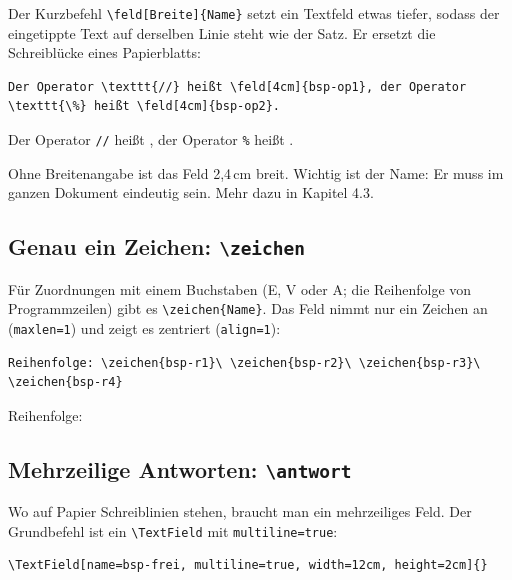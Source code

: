 \begin{Form}
Der Kurzbefehl \verb|\feld[Breite]{Name}| setzt ein Textfeld etwas tiefer,
sodass der eingetippte Text auf derselben Linie steht wie der Satz. Er
ersetzt die Schreiblücke eines Papierblatts:

\begin{lstlisting}[style=latex]
Der Operator \texttt{//} heißt \feld[4cm]{bsp-op1}, der Operator
\texttt{\%} heißt \feld[4cm]{bsp-op2}.
\end{lstlisting}

\begin{ausgabe}
Der Operator \texttt{//} heißt , der Operator
\texttt{\%} heißt .
\end{ausgabe}


Ohne Breitenangabe ist das Feld 2,4\,cm breit. Wichtig ist der Name: Er muss
im ganzen Dokument eindeutig sein. Mehr dazu in Kapitel 4.3.

\subsection{Genau ein Zeichen: \texttt{\textbackslash zeichen}}

Für Zuordnungen mit einem Buchstaben (E, V oder A; die Reihenfolge von
Programmzeilen) gibt es \verb|\zeichen{Name}|. Das Feld nimmt nur ein Zeichen
an (\texttt{maxlen=1}) und zeigt es zentriert (\texttt{align=1}):

\begin{lstlisting}[style=latex]
Reihenfolge: \zeichen{bsp-r1}\ \zeichen{bsp-r2}\ \zeichen{bsp-r3}\
\zeichen{bsp-r4}
\end{lstlisting}

\begin{ausgabe}
Reihenfolge: \ \ \
\end{ausgabe}


\subsection{Mehrzeilige Antworten: \texttt{\textbackslash antwort}}

Wo auf Papier Schreiblinien stehen, braucht man ein mehrzeiliges Feld. Der
Grundbefehl ist ein \verb|\TextField| mit \texttt{multiline=true}:

\begin{lstlisting}[style=latex]
\TextField[name=bsp-frei, multiline=true, width=12cm, height=2cm]{}
\end{lstlisting}


\end{Form}

